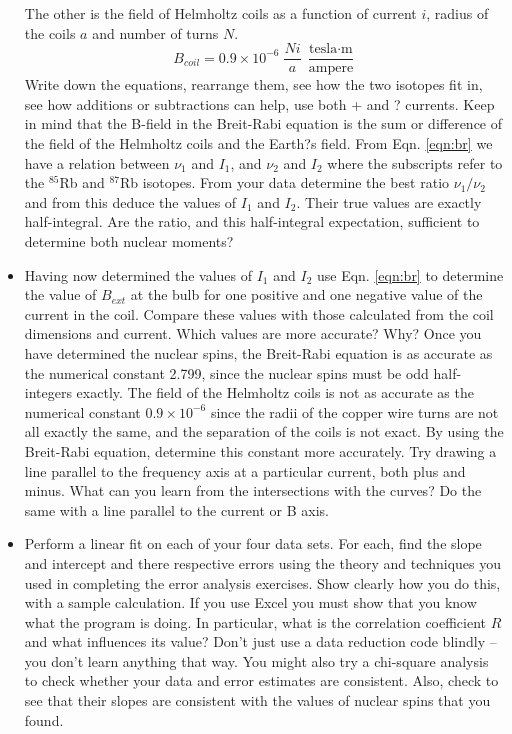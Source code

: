 \documentclass[11pt]{article}
\begin{document}
\begin{itemize}
The other is the field of Helmholtz coils as a function of current $i$, radius of the coils $a$ and number of turns $N$.
\begin{equation}
B_{coil}=0.9\times 10^{-6}\;\frac{Ni}{a}\;\frac{\textrm{tesla}\cdot\textrm{m}}{\textrm{ampere}}
\label{eqn:coil}
\end{equation}
Write down the equations, rearrange them, see how the two isotopes fit in, see how additions or subtractions can help, use both + and ? currents. Keep in mind that the B-field in the Breit-Rabi equation is the sum or difference of the field of the Helmholtz coils and the Earth?s field. From Eqn. \ref{eqn:br} we have a relation between $\nu_1$ and $I_1$, and $\nu_2$ and $I_2$ where the subscripts refer to the $^85$Rb and $^87$Rb isotopes. From your data determine the best ratio $\nu_1/\nu_2$ and from this deduce the values of $I_1$ and $I_2$. Their true values are exactly half-integral. Are the ratio, and this half-integral expectation, sufficient to determine both nuclear moments?
\item Having now determined the values of $I_1$ and $I_2$ use Eqn. \ref{eqn:br} to determine the value of $B_{ext}$ at the bulb for one positive and one negative value of the current in the coil. Compare these values with those calculated from the coil dimensions and current. Which values are more accurate? Why? Once you have determined the nuclear spins, the Breit-Rabi equation is as accurate as the numerical constant 2.799, since the nuclear spins must be odd half-integers exactly. The field of the Helmholtz coils is not as accurate as the numerical constant $0.9\times 10^{-6}$ since the radii of the copper wire turns are not all exactly the same, and the separation of the coils is not exact. By using the Breit-Rabi equation, determine this constant more accurately. Try drawing a line parallel to the frequency axis at a particular current, both plus and minus. What can you learn from the intersections with the curves? Do the same with a line parallel to the current or B axis.
\item Perform a linear fit on each of your four data sets. For each, find the slope and intercept and there respective errors using the theory and techniques you used in completing the error analysis exercises. Show clearly how you do this, with a sample calculation. If you use Excel you must show that you know what the program is doing. In particular, what is the correlation coefficient $R$ and what influences its value? Don't just use a data reduction code blindly -- you don't learn anything that way. You might also try a chi-square analysis to check whether your data and error estimates are consistent. Also, check to see that their slopes are consistent with the values of nuclear spins that you found.

\end{itemize}
\end{document}
